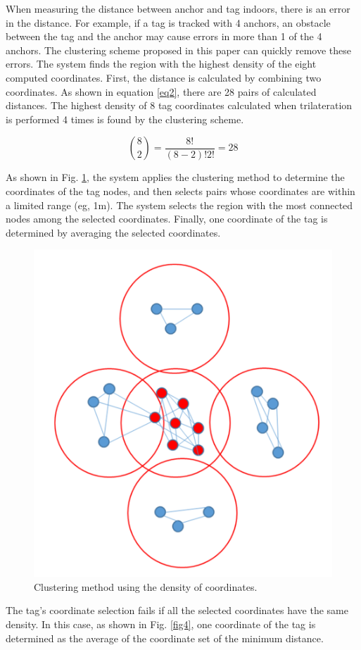 \documentclass[conference]{IEEEtran}
\begin{document}
When measuring the distance between anchor and tag indoors, there is an error in the distance. For example, if a tag is tracked with 4 anchors, an obstacle between the tag and the anchor may cause errors in more than 1 of the 4 anchors. The clustering scheme proposed in this paper can quickly remove these errors. The system finds the region with the highest density of the eight computed coordinates. First, the distance is calculated by combining two coordinates. As shown in equation \ref{eq2}, there are 28 pairs of calculated distances. The highest density of 8 tag coordinates calculated when trilateration is performed 4 times is found by the clustering scheme.

\begin{equation}
    \binom{8}{2} = \frac{8!}{(8-2)!2!}=28\label{eq2}
\end{equation}

As shown in Fig. \ref{fig3}, the system applies the clustering method to determine the coordinates of the tag nodes, and then selects pairs whose coordinates are within a limited range (eg, 1m). The system selects the region with the most connected nodes among the selected coordinates. Finally, one coordinate of the tag is determined by averaging the selected coordinates.

\begin{figure}[htbp]
    \centerline{\includegraphics[width=0.62\columnwidth]{fig3.png}}
    \caption{Clustering method using the density of coordinates.}
    \label{fig3}
\end{figure}

The tag's coordinate selection fails if all the selected coordinates have the same density. In this case, as shown in Fig. \ref{fig4}, one coordinate of the tag is determined as the average of the coordinate set of the minimum distance.
\end{document}
